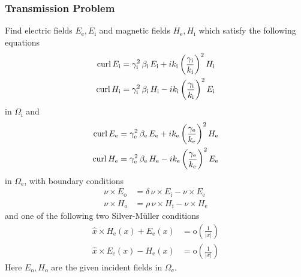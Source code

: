 \subsubsection{Transmission Problem} 
Find electric fields $E_\text{e}, E_\text{i}$ and magnetic fields $H_\text{e}, H_\text{i}$ which satisfy the following equations
\begin{equation}
\begin{split}
  \operatorname{curl} E_\text{i} &= \gamma_\text{i}^2\,\beta_\text{i}\,E_\text{i} + ik_\text{i}\left(\frac{\gamma_\text{i}}{k_\text{i}}\right)^2 H_\text{i} \\
  \operatorname{curl} H_\text{i} &= \gamma_\text{i}^2\,\beta_\text{i}\,H_\text{i} - ik_\text{i}\left(\frac{\gamma_\text{i}}{k_\text{i}}\right)^2 E_\text{i} 
\end{split}
\end{equation}
in $\Omega_\text{i}$ and
\begin{equation}
\begin{split}
  \operatorname{curl} E_\text{e} &= \gamma_\text{e}^2\,\beta_\text{e}\,E_\text{e} + ik_\text{e}\left(\frac{\gamma_\text{e}}{k_\text{e}}\right)^2 H_\text{e} \\
  \operatorname{curl} H_\text{e} &= \gamma_\text{e}^2\,\beta_\text{e}\,H_\text{e} - ik_\text{e}\left(\frac{\gamma_\text{e}}{k_\text{e}}\right)^2 E_\text{e} 
\end{split}
\end{equation}
in $\Omega_\text{e}$, with boundary conditions
\begin{equation}
\begin{split}
  \nu\times E_\text{o} &= \delta\,\nu\times E_\text{i} - \nu\times E_\text{e}\\
  \nu\times H_\text{o} &= \rho\,\nu\times H_\text{i} - \nu\times H_\text{e} 
\end{split}
\end{equation}
and one of the following two Silver-M\"uller conditions
\begin{align}
  \hat{x}\times H_\text{e}(x) + E_\text{e}(x) &= \text{o}\left(\frac{1}{|x|}\right) \\
  \hat{x}\times E_\text{e}(x) - H_\text{e}(x) &= \text{o}\left(\frac{1}{|x|}\right) 
\end{align}
Here $E_\text{o}, H_\text{o}$ are the given incident fields in $\Omega_\text{e}$.

